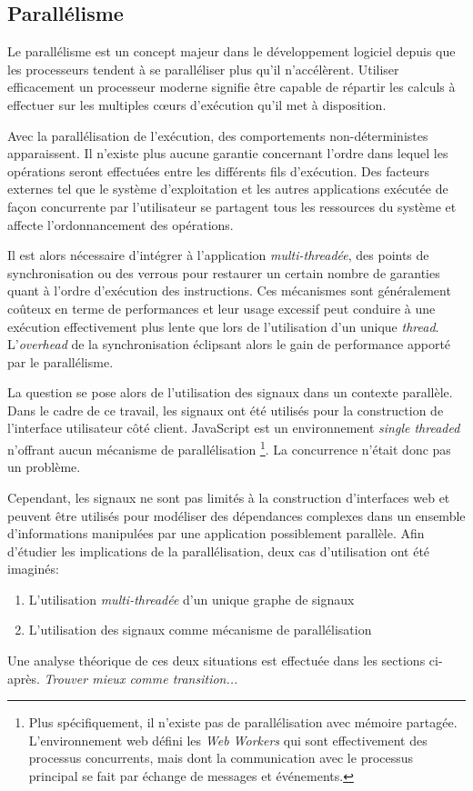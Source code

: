 \subsection{Parallélisme}

Le parallélisme est un concept majeur dans le développement logiciel depuis que les processeurs tendent à se paralléliser plus qu'il n'accélèrent. Utiliser efficacement un processeur moderne signifie être capable de répartir les calculs à effectuer sur les multiples cœurs d'exécution qu'il met à disposition.

Avec la parallélisation de l'exécution, des comportements non-déterministes apparaissent. Il n'existe plus aucune garantie concernant l'ordre dans lequel les opérations seront effectuées entre les différents fils d'exécution. Des facteurs externes tel que le système d'exploitation et les autres applications exécutée de façon concurrente par l'utilisateur se partagent tous les ressources du système et affecte l'ordonnancement des opérations.

Il est alors nécessaire d'intégrer à l'application \emph{multi-threadée}, des points de synchronisation ou des verrous pour restaurer un certain nombre de garanties quant à l'ordre d'exécution des instructions. Ces mécanismes sont généralement coûteux en terme de performances et leur usage excessif peut conduire à une exécution effectivement plus lente que lors de l'utilisation d'un unique \emph{thread}. L'\emph{overhead} de la synchronisation éclipsant alors le gain de performance apporté par le parallélisme.

La question se pose alors de l'utilisation des signaux dans un contexte parallèle. Dans le cadre de ce travail, les signaux ont été utilisés pour la construction de l'interface utilisateur côté client. JavaScript est un environnement \emph{single threaded} n'offrant aucun mécanisme de parallélisation \footnote{Plus spécifiquement, il n'existe pas de parallélisation avec mémoire partagée. L'environnement web défini les \emph{Web Workers} qui sont effectivement des processus concurrents, mais dont la communication avec le processus principal se fait par échange de messages et événements.}. La concurrence n'était donc pas un problème.

Cependant, les signaux ne sont pas limités à la construction d'interfaces web et peuvent être utilisés pour modéliser des dépendances complexes dans un ensemble d'informations manipulées par une application possiblement parallèle. Afin d'étudier les implications de la parallélisation, deux cas d'utilisation ont été imaginés:
\begin{enumerate}
	\item L'utilisation \emph{multi-threadée} d'un unique graphe de signaux
	\item L'utilisation des signaux comme mécanisme de parallélisation
\end{enumerate}
Une analyse théorique de ces deux situations est effectuée dans les sections ci-après. \textit{Trouver mieux comme transition...}

